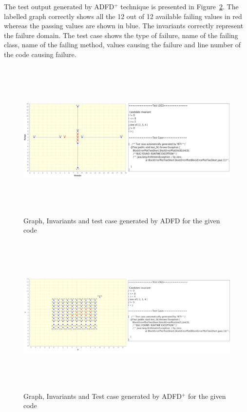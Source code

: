 The test output generated by ADFD$^+$ technique is presented in Figure~\ref{fig:ADFD+}. The labelled graph correctly shows all the 12 out of 12 available failing values in red whereas the passing values are shown in blue. The invariants correctly represent the failure domain. The test case shows the type of failure, name of the failing class, name of the failing method, values causing the failure and line number of the code causing failure.



\begin{figure}[H]
\centering
\includegraphics[width= 15.5cm,height=8cm]{chapter7/adfdCombined.png}
\caption{Graph, Invariants and test case generated by ADFD for the given code}
\label{fig:ADFD}
\end{figure}



\bigskip
\begin{figure}[H]
\centering
\includegraphics[width= 15.5cm,height=8cm]{chapter7/adfdPlusCombined.png}
\caption{Graph, Invariants and Test case generated by ADFD$^+$ for the given code}
\label{fig:ADFD+}
\end{figure}
\bigskip



